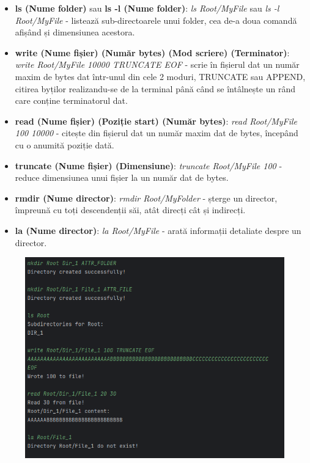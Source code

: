 \begin{itemize}
  \item \textbf{ls (Nume folder)} sau \textbf{ls -l (Nume folder)}: \textit{ls Root/MyFile} sau \textit{ls -l Root/MyFile} - listează sub-directoarele unui folder, cea de-a doua comandă afișând și dimensiunea acestora.

  \item \textbf{write (Nume fișier) (Număr bytes) (Mod scriere) (Terminator)}: \textit{write Root/MyFile 10000 TRUNCATE EOF} - scrie în fișierul dat un număr maxim de bytes dat într-unul din cele 2 moduri, TRUNCATE sau APPEND, citirea byților realizandu-se de la terminal până când se întâlnește un rând care conține terminatorul dat.

  \item \textbf{read (Nume fișier) (Poziție start) (Număr bytes)}: \textit{read Root/MyFile 100 10000} - citește din fișierul dat un număr maxim dat de bytes, începând cu o anumită poziție dată.

  \item \textbf{truncate (Nume fișier) (Dimensiune)}: \textit{truncate Root/MyFile 100} - reduce dimensiunea unui fișier la un număr dat de bytes.

  \item \textbf{rmdir (Nume director)}: \textit{rmdir Root/MyFolder} - șterge un director, împreună cu toți descendenții săi, atât direcți cât și indirecți.

  \item \textbf{la (Nume director)}: \textit{la Root/MyFile} - arată informații detaliate despre un director.
\end{itemize}


\begin{figure}[h]
    \centering
    \includegraphics[width=1.0\linewidth]{images/2.5.1.png}
    \label{fig:enter-label}
\end{figure}

